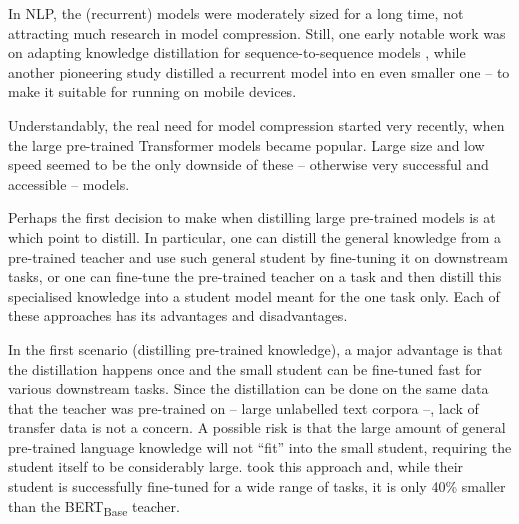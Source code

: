 \documentclass[bsc,frontabs,twoside,singlespacing,parskip,deptreport]{infthesis}
\begin{document}
{{{      %
      In NLP, the (recurrent) models were moderately sized for a long time, not attracting much research in model compression. Still, one early notable work was on adapting knowledge distillation for sequence-to-sequence models \citep{Kim_2016}, while another pioneering study \citep{Yu_2018} distilled a recurrent model into en even smaller one -- to make it suitable for running on mobile devices.

      Understandably, the real need for model compression started very recently, when the large pre-trained Transformer models became popular. Large size and low speed seemed to be the only downside of these -- otherwise very successful and accessible -- models.

      Perhaps the first decision to make when distilling large pre-trained models is at which point to distill. In particular, one can distill the general knowledge from a pre-trained teacher and use such general student by fine-tuning it on downstream tasks, or one can fine-tune the pre-trained teacher on a task and then distill this specialised knowledge into a student model meant for the one task only. Each of these approaches has its advantages and disadvantages.

      In the first scenario (distilling pre-trained knowledge), a major advantage is that the distillation happens once and the small student can be fine-tuned fast for various downstream tasks.
      Since the distillation can be done on the same data that the teacher was pre-trained on -- large unlabelled text corpora --, lack of transfer data is not a concern.
      A possible risk is that the large amount of general pre-trained language knowledge will not ``fit'' into the small student, requiring the student itself to be considerably large. \citet{Sanh_2019} took this approach and, while their student is successfully fine-tuned for a wide range of tasks, it is only 40\% smaller than the BERT\textsubscript{Base} teacher.

}}}
\end{document}
